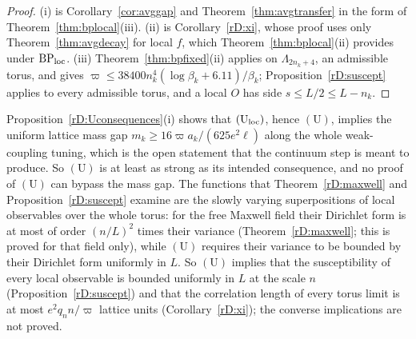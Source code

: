 \begin{proof}
(i) is Corollary~\ref{cor:avggap} and Theorem~\ref{thm:avgtransfer} in the
form of Theorem~\ref{thm:bplocal}(iii). (ii) is Corollary~\ref{rD:xi},
whose proof uses only Theorem~\ref{thm:avgdecay} for local $f$, which
Theorem~\ref{thm:bplocal}(ii) provides under $\mathrm{BP}_{\rm loc}$.
(iii) Theorem~\ref{thm:bpfixed}(ii) applies on $\Lambda_{2n_k+4}$, an
admissible torus, and gives $\varpi\le38400n_k^4(\log\beta_k+6.11)/
\beta_k$; Proposition~\ref{rD:suscept} applies to every admissible torus,
and a local $O$ has side $s\le L/2\le L-n_k$.
\end{proof}

\begin{remark}\label{rD:obstruction}
Proposition~\ref{rD:Uconsequences}(i) shows that $(\mathrm U_{\rm loc})$,
hence $(\mathrm U)$, implies the uniform lattice mass gap $m_k\ge16
\varpi a_k/(625e^2\ell)$ along the whole weak-coupling tuning, which
is the open statement that the continuum step is meant to produce. So
$(\mathrm U)$ is at least as strong as its intended consequence, and no
proof of $(\mathrm U)$ can bypass the mass gap. The functions that
Theorem~\ref{rD:maxwell} and Proposition~\ref{rD:suscept} examine are the
slowly varying superpositions of local observables over the whole torus:
for the free Maxwell field their Dirichlet form is at most of order $(n/L)^2$
times their variance (Theorem~\ref{rD:maxwell}; this is proved for that
field only), while $(\mathrm U)$ requires their variance to be bounded by
their Dirichlet form uniformly in $L$. So $(\mathrm U)$ implies that the
susceptibility of every local observable is bounded uniformly in $L$ at the
scale $n$ (Proposition~\ref{rD:suscept}) and that the correlation length of
every torus limit is at most $e^2q_nn/\varpi$ lattice units
(Corollary~\ref{rD:xi}); the converse implications are not proved.


\end{remark}
